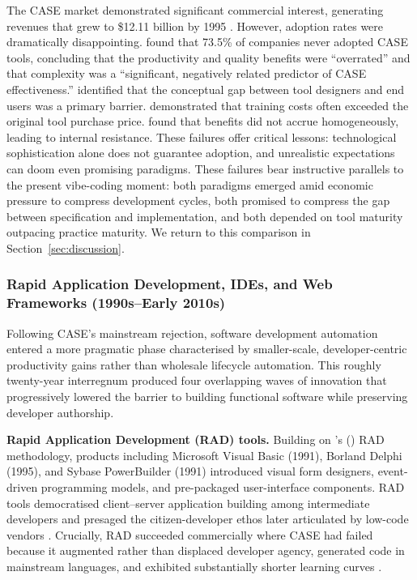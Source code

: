 \documentclass[preprint,12pt,authoryear]{elsarticle}
\begin{document}
The CASE market demonstrated significant commercial interest, generating revenues that grew to \$12.11 billion by 1995 \citep{Sanchis2020}. However, adoption rates were dramatically disappointing. \citet{Iivari1996} found that 73.5\% of companies never adopted CASE tools, concluding that the productivity and quality benefits were ``overrated'' and that complexity was a ``significant, negatively related predictor of CASE effectiveness.'' \citet{Lundell2004} identified that the conceptual gap between tool designers and end users was a primary barrier. \citet{Huff1992} demonstrated that training costs often exceeded the original tool purchase price. \citet{Orlikowski1993} found that benefits did not accrue homogeneously, leading to internal resistance. These failures offer critical lessons: technological sophistication alone does not guarantee adoption, and unrealistic expectations can doom even promising paradigms. These failures bear instructive parallels to the present vibe-coding moment: both paradigms emerged amid economic pressure to compress development cycles, both promised to compress the gap between specification and implementation, and both depended on tool maturity outpacing practice maturity. We return to this comparison in Section~\ref{sec:discussion}.

\subsubsection{Rapid Application Development, IDEs, and Web Frameworks (1990s--Early 2010s)}

Following CASE's mainstream rejection, software development automation entered a more pragmatic phase characterised by smaller-scale, developer-centric productivity gains rather than wholesale lifecycle automation. This roughly twenty-year interregnum produced four overlapping waves of innovation that progressively lowered the barrier to building functional software while preserving developer authorship.

\textbf{Rapid Application Development (RAD) tools.} Building on \citeauthor{Martin1991}'s (\citeyear{Martin1991}) RAD methodology, products including Microsoft Visual Basic (1991), Borland Delphi (1995), and Sybase PowerBuilder (1991) introduced visual form designers, event-driven programming models, and pre-packaged user-interface components. RAD tools democratised client--server application building among intermediate developers and presaged the citizen-developer ethos later articulated by low-code vendors \citep{Martin1991, Beynon1999}. Crucially, RAD succeeded commercially where CASE had failed because it augmented rather than displaced developer agency, generated code in mainstream languages, and exhibited substantially shorter learning curves \citep{Beynon1999}.
\end{document}
